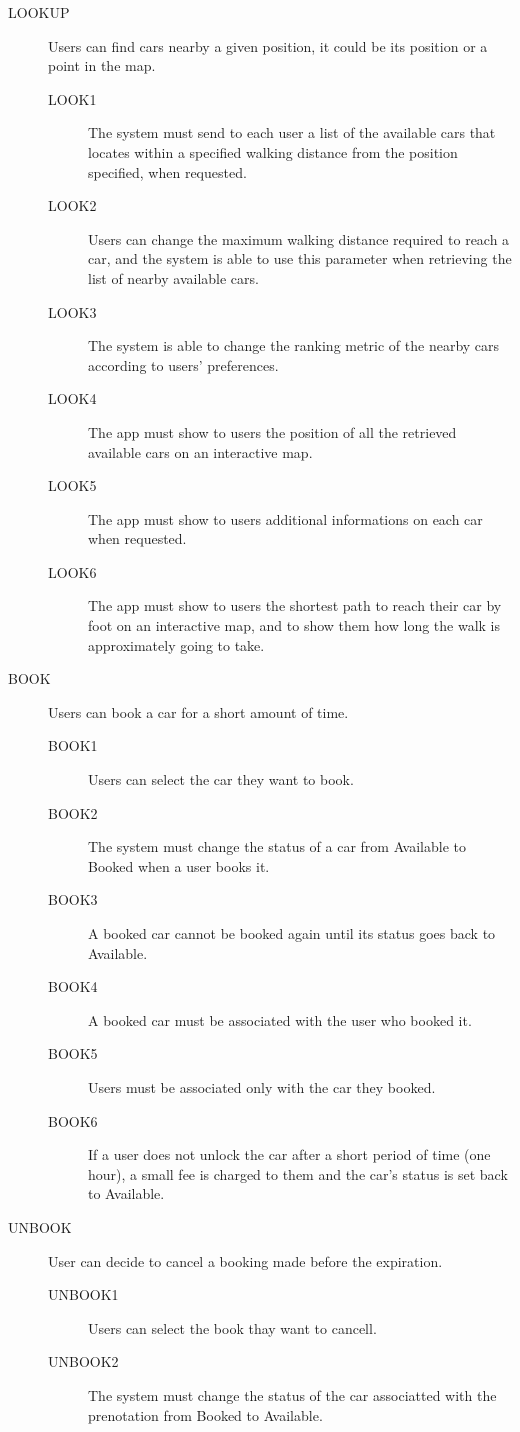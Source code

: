 \documentclass[11pt]{article} %
\begin{document}
\begin{description}
 	\item[LOOKUP] Users can find cars nearby a given position, it could be its position or a point in the map.
	\begin{description}
	\item[LOOK1] The system must send to each user a list of the available cars that locates within a specified walking distance from the position specified, when requested.
	\item[LOOK2] Users can change the maximum walking distance required to reach a car, and the system is able to use this parameter when retrieving the list of nearby available cars.
	\item[LOOK3] The system is able to change the ranking metric of the nearby cars according to users' preferences.
	\item[LOOK4] The app must show to users the position of all the retrieved available cars on an interactive map.
	\item[LOOK5] The app must show to users additional informations on each car when requested.
	\item[LOOK6] The app must show to users the shortest path to reach their car by foot on an interactive map, and to show them how long the walk is approximately going to take.
	\end{description}

 	\item[BOOK] Users can book a car for a short amount of time.
	\begin{description}
	\item[BOOK1] Users can select the car they want to book.
	\item[BOOK2] The system must change the status of a car from Available to Booked when a user books it.
	\item[BOOK3] A booked car cannot be booked again until its status goes back to Available.
	\item[BOOK4] A booked car must be associated with the user who booked it.
	\item[BOOK5] Users must be associated only with the car they booked.
	\item[BOOK6] If a user does not unlock the car after a short period of time (one hour), a small fee is charged to them and the car's status is set back to Available.
	\end{description}

	\item[UNBOOK] User can decide to cancel a booking made before the expiration.
	\begin{description}
	\item[UNBOOK1] Users can select the book thay want to cancell.
	\item[UNBOOK2] The system must change the status of the car associatted with the prenotation from Booked to Available.
	\end{description}
	

\end{description}
\end{document}
